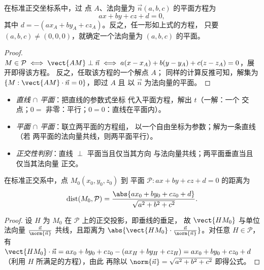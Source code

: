 \begin{theorem}[平面的笛卡尔方程]\label{thm:g12:space:planeeq}
在标准正交坐标系中，过
点 $A$、法向量为 $\vec n(a, b, c)$ 的平面方程为
\[
a x + b y + c z + d = 0,
\]
其中 $d = -(ax_A + by_A + cz_A)$。反之，任一形如上式的方程，
只要 $(a,b,c) \neq (0,0,0)$，就确定一个法向量为 $(a, b, c)$ 的平面。
\end{theorem}

\begin{proof}
$M \in \mathcal P \iff \vect{AM} \perp \vec n \iff
a(x - x_A) + b(y - y_A) + c(z - z_A) = 0$，展开即得该方程。
反之，任取该方程的一个解点 $A$；
同样的计算反推可知，解集为
$\{M : \vect{AM}\cdot\vec n = 0\}$，即过 $A$ 且
以 $\vec n$ 为法向量的平面。
\end{proof}

\begin{method}[交集的实际求法]\label{met:g12:space:intersections}
\begin{itemize}
  \item \emph{直线 $\cap$ 平面}：把直线的参数式坐标
        代入平面方程，解出 $t$（一解：一个
        交点；$0 = $ 非零：平行；$0 = 0$：直线在平面内）。
  \item \emph{平面 $\cap$ 平面}：联立两平面的方程组，
        以一个自由坐标为参数；解为一条直线（若
        两平面的法向量共线，则两平面平行）。
  \item \emph{正交性判别}：直线 $\perp$ 平面当且仅当其方向
        与法向量共线；两平面垂直当且仅当其法向量
        正交。
\end{itemize}
\end{method}

\begin{proposition}[点到平面的距离]\label{prop:g12:space:distance}
在标准正交系中，点 $M_0(x_0, y_0, z_0)$ 到
平面 $\mathcal P : ax + by + cz + d = 0$ 的距离为
\[
\operatorname{dist}(M_0, \mathcal P)
= \frac{\abs{ax_0 + by_0 + cz_0 + d}}{\sqrt{a^2 + b^2 + c^2}}.
\]
\end{proposition}

\begin{proof}
设 $H$ 为 $M_0$ 在 $\mathcal P$ 上的正交投影，即垂线的垂足，
故 $\vect{HM_0}$ 与单位法向量
$\frac{\vec n}{\norm{\vec n}}$ 共线，且距离为
$\abs{\vect{HM_0}\cdot \frac{\vec n}{\norm{\vec n}}}$。对任意
$H \in \mathcal P$，
有 $\vect{HM_0}\cdot\vec n = ax_0 + by_0 + cz_0 - (ax_H + by_H + cz_H)
= ax_0 + by_0 + cz_0 + d$（利用 $H$ 所满足的方程），由此
再除以 $\norm{\vec n} = \sqrt{a^2+b^2+c^2}$ 即得公式。
\end{proof}

